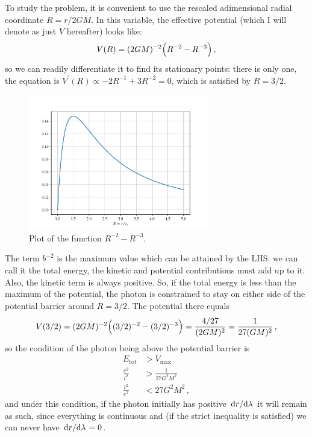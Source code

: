 \documentclass[main.tex]{subfiles}
\begin{document}
To study the problem, it is convenient to use the rescaled adimensional radial coordinate \(R = r / 2GM\). In this variable, the effective potential (which I will denote as just \(V\) hereafter) looks like: 
%
\begin{align}
  V (R) = (2GM)^{-2} \qty(R^{-2} - R^{-3})
\,,
\end{align}
%
so we can readily differentiate it to find its stationary points: there is only one, the equation is  \(V^{\prime }(R) \propto -2R^{-1} + 3R^{-2} =0 \), which is satisfied by \(R = 3 / 2\).

\begin{figure}[ht]
    \centering
    \includegraphics[width=0.7\textwidth]{figures/photon_effective_potential.pdf}
    \caption{Plot of the function \(R^{-2} - R^{-3}\).}
    \label{fig:effective-potential}
\end{figure}

The term \(b^{-2}\) is the maximum value which can be attained by the LHS: we can call it the total energy, the kinetic and potential contributions must add up to it. 
Also, the kinetic term is always positive. 
So, if the total energy is less than the maximum of the potential, the photon is constrained to stay on either side of the potential barrier around \(R = 3/2\). The potential there equals 
%
\begin{align}
  V(3/2) = (2GM)^{-2} \qty((3/2)^{-2} - (3/2)^{-3}) 
  = \frac{4/27}{(2GM)^2} = \frac{1}{27 (GM)^2}
\,,
\end{align} 
%
so the condition of the photon being above the potential barrier is 
%
\begin{align}
  E _{\text{tot}} &> V _{\text{max}}  \\
  \frac{e^2}{l^2} &> \frac{1}{27 G^2M^2}  \\
  \frac{l^2}{e ^2} &< 27G^2M^2
\,,
\end{align}
%
and under this condition, if the photon initially has positive \(\dv*{r}{\lambda }\) it will remain as such, since everything is continuous and (if the strict inequality is satisfied) we can never have \(\dv*{r}{\lambda }=0\). 
\end{document}
